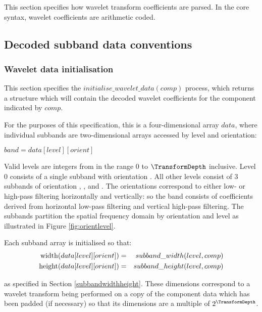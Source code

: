 
\label{transformdec}

This section specifies how wavelet transform coefficients are parsed.
In the core syntax, wavelet coefficients are arithmetic coded. 


\subsection{Decoded subband data conventions}
\label{wltdecodeconventions}

\subsubsection{Wavelet data initialisation}

\label{wltinit}

This section specifies the $initialise\_wavelet\_data(comp)$ process, which returns a structure which will
contain the decoded wavelet coefficients for the component indicated by $comp$. 

For the purposes of this specification, this is a four-dimensional array $data$,
where individual subbands are two-dimensional arrays accessed by level and orientation:

$band = data[level][orient]$

Valid levels are integers from in the range 0 to $\TransformDepth$ inclusive. 
Level 0 consists of a single subband with orientation \LL. 
All other levels consist of 3 subbands of orientation \LH, \HL, 
and \HH. The orientations correspond to either low- or high-pass filtering
horizontally and vertically: so the \LH band consists of coefficients derived
from horizontal low-pass filtering and vertical high-pass filtering. The subbands
partition the spatial frequency domain by orientation and level as illustrated
in Figure \ref{fig:orientlevel}.

Each subband array is initialised so that:
\begin{eqnarray*}
\operatorname{width}(data[level][orient]) & = & subband\_width(level,comp) \\
\operatorname{height}(data[level][orient]) & = & subband\_height(level,comp)
\end{eqnarray*}

as specified in Section \ref{subbandwidthheight}. These dimensions correspond 
to a wavelet transform being performed on a copy of the component data which 
has been padded (if necessary) so that its
dimensions are a multiple of $2^{\TransformDepth}$.

